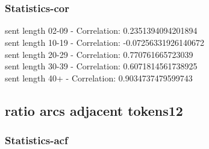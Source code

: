 \documentclass{article}%
\begin{document}
\begin{figure}[ht]%
\centering%
\setlength{\abovecaptionskip}{-35pt}%
%
%
\\%
%
%
\\%
%
\end{figure}

%
\newpage%
\subsubsection{Statistics{-}cor}%
\label{ssubsec:Statistics{-}cor}%
\noindent%
sent length 02-09 - Correlation: 0.2351394094201894\\%
sent length 10-19 - Correlation: -0.07256331926140672\\%
sent length 20-29 - Correlation: 0.770761665723039\\%
sent length 30-39 - Correlation: 0.6071814561738925\\%
sent length 40+ - Correlation: 0.9034737479599743\\

%
\newpage

%
\subsection{ratio arcs adjacent tokens12}%
\label{subsec:ratioarcsadjacenttokens12}%
\subsubsection{Statistics{-}acf}%
\label{ssubsec:Statistics{-}acf}%
\end{document}
